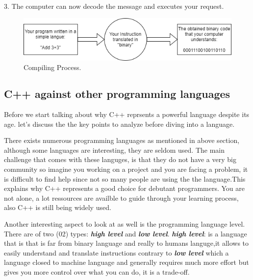 \documentclass[11pt, a4paper]{article}
\begin{document}
3. The computer can now decode the message and executes your request.

\begin{figure}[!ht]
\includegraphics[width = \linewidth]{diagrams/compling.png}
\caption{Compiling Process.}
\label{fig:Compiling Process}
\end{figure}

\subsection{C++ against other programming languages}
Before we start talking about why C++ reprsents a powerful language despite its age. let's discuss the
the key points to analyze before diving into a language.

There exists numerous programming languages as mentioned in above section, although some languages are interesting, 
they are seldom used. The main challenge that comes with these languges, is that they do not have a very big community 
so imagine you working on a project and you are facing a problem, it is difficult to find help since not so many people 
are using the the language.This explains why C++ represents a good choice for debutant programmers. You are not alone, a lot
ressources are availble to guide through your learning process, also C++ is still being widely used.

Another interesting aspect to look at as well is the programming language level. There are of two (02)
types: \textbf{\textit{{high level}}} and \textbf{\textit{{low level}}}.
\newline
\textbf{\textit{{high level}}}: is a language that is that is far from binary language and really
to humans languge,it allows to easily understand and translate instructions contrary to \textbf{\textit{{low level}}}
which a language closed to machine language and generally requires much more effort but gives you more 
control over what you can do, it is a trade-off.
\end{document}
